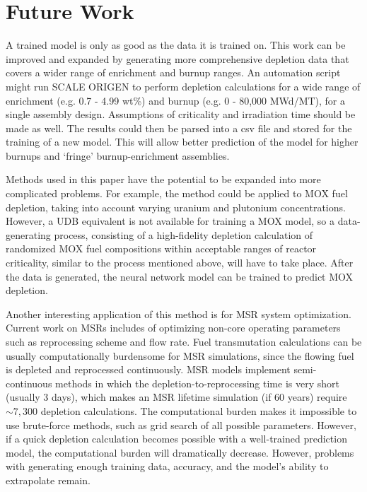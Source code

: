 \section{Future Work}

A trained model is only as good as the data it is trained on.
This work can be improved and expanded by generating
more comprehensive depletion data that covers a wider
range of enrichment and burnup ranges. An automation
script might run SCALE ORIGEN to perform depletion calculations
for a wide range of enrichment (e.g. 0.7 - 4.99 wt\%) and burnup (e.g. 0 - 80,000 MWd/MT),
for a single assembly design. Assumptions of criticality
and irradiation time should be made as well. The results
could then be parsed into a csv file and stored for
the training of a new model. This will allow better
prediction of the model for higher burnups and `fringe'
burnup-enrichment assemblies.

Methods used in this paper have the potential to be expanded into more
complicated problems. For example, the method
could be applied to \gls{MOX} fuel depletion, taking
into account varying uranium and plutonium concentrations.
However, a \gls{UDB} equivalent is not available
for training a \gls{MOX} model, so a
data-generating process, consisting of a high-fidelity
depletion calculation of randomized \gls{MOX} fuel
compositions within acceptable ranges of reactor
criticality, similar to the process mentioned above,
will have to take place. After the data
is generated, the neural network model can be trained
to predict \gls{MOX} depletion.

Another interesting application of this method is for
\gls{MSR} system optimization. Current work on
\glspl{MSR} includes of optimizing non-core operating
parameters such as reprocessing scheme and flow rate.
Fuel transmutation calculations
can be usually computationally burdensome for \gls{MSR}
simulations, since the flowing fuel is depleted and
reprocessed continuously. \gls{MSR} models implement semi-continuous
methods in which the depletion-to-reprocessing time is
very short (usually 3 days), which makes an
\gls{MSR} lifetime simulation (if 60 years)
require $\sim 7,300$ depletion calculations.
The computational burden
makes it impossible to use brute-force methods,
such as grid search of all possible parameters.
However, if a quick depletion calculation becomes possible
with a well-trained prediction model, the
computational burden will dramatically decrease.
However, problems with generating enough
training data, accuracy, and the model's ability to
extrapolate remain.